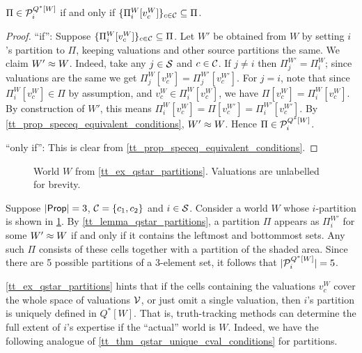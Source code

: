 \begin{lemma}
    \label{tt_lemma_qstar_partitions}
    $\Pi \in \mathcal{P}^{Q^*[W]}_i$
    if and only if
    $\{\Pi^W_i[v^W_c]\}_{c \in \mathcal{C}} \subseteq \Pi$.
\end{lemma}

\begin{proof}

    ``if'': Suppose $\{\Pi^W_i[v^W_c]\}_{c \in \mathcal{C}} \subseteq \Pi$. Let $W'$ be
    obtained from $W$ by setting $i$'s partition to $\Pi$, keeping valuations
    and other source partitions the same. We claim $W' \approx W$. Indeed, take
    any $j \in \mathcal{S}$ and $c \in \mathcal{C}$. If $j \ne i$ then $\Pi^{W'}_j =
    \Pi^W_i$; since valuations are the same we get $\Pi^W_j[v^W_c] =
    \Pi^{W'}_j[v^{W'}_c]$. For $j = i$, note that since $\Pi^W_i[v^W_c] \in
    \Pi$ by assumption, and $v^W_c \in \Pi^W_i[v^W_c]$, we have $\Pi[v^W_c] =
    \Pi^W_i[v^W_c]$. By construction of $W'$, this means $\Pi^W_i[v^W_c] =
    \Pi[v^{W'}_c] = \Pi^{W'}_i[v^{W'}_c]$. By
    \cref{tt_prop_speceq_equivalent_conditions},
    $W' \approx W$. Hence $\Pi \in \mathcal{P}^{Q^*[W]}_i$.

    ``only if'': This is clear from \cref{tt_prop_speceq_equivalent_conditions}.
\end{proof}

\begin{figure}
    \centering
    
    \caption{
        World $W$ from \cref{tt_ex_qstar_partitions}. Valuations are unlabelled
        for brevity.
    }
    \label{tt_fig_qstar_partitions}
\end{figure}

\begin{example}
    \label{tt_ex_qstar_partitions}
    Suppose $|\mathsf{Prop}| = 3$, $\mathcal{C} = \{c_1, c_2\}$ and $i \in \mathcal{S}$.
    Consider a world $W$ whose $i$-partition is shown in
    \cref{tt_fig_qstar_partitions}. By \cref{tt_lemma_qstar_partitions}, a partition
    $\Pi$ appears as $\Pi^{W'}_i$ for some $W' \approx W$ if and only if it
    contains the leftmost and bottommost sets. Any such $\Pi$ consists
    of these cells together with a partition of the shaded area. Since there
    are 5 possible partitions of a 3-element set, it follows that
    $|\mathcal{P}^{Q^*[W]}_i| = 5$.
\end{example}

\cref{tt_ex_qstar_partitions} hints that if the cells containing the valuations
$v^W_c$ cover the whole space of valuations $\mathcal{V}$, or just omit a single
valuation, then $i$'s partition is uniquely defined in $Q^*[W]$. That is,
truth-tracking methods can determine the full extent of $i$'s expertise if the
``actual'' world is $W$. Indeed, we have the following analogue of
\cref{tt_thm_qstar_unique_cval_conditions} for partitions.

